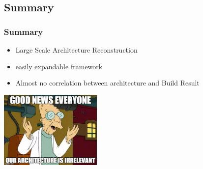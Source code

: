 \documentclass{beamer}
\begin{document}
\subsection{Summary}
\begin{frame}
\frametitle{Summary}

\begin{itemize}
	\item Large Scale Architecture Reconstruction
	\item easily expandable framework
	\item Almost no correlation between architecture and Build Result
\end{itemize}
\pause
\begin{center}
	\includegraphics[width=5cm]{assets/professor.jpg}
\end{center}

\end{frame}
 
\end{document}

